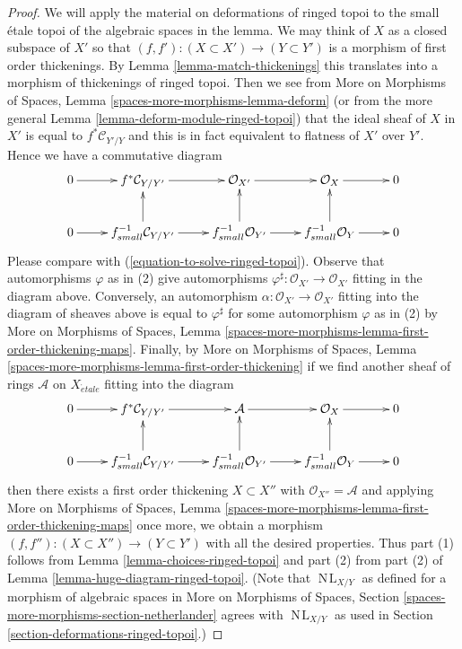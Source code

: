 \documentclass{stacks-project}
\theoremstyle{plain}
\theoremstyle{definition}
\theoremstyle{remark}
\numberwithin{equation}{subsection}
\def\NL{\mathop{N\!L}\nolimits}
\def\etale{{\acute{e}tale}}
\begin{document}
\begin{proof}
We will apply the material on deformations of ringed topoi
to the small \'etale topoi of the algebraic spaces in the lemma.
We may think of $X$ as a closed subspace of $X'$
so that $(f, f') : (X \subset X') \to (Y \subset Y')$
is a morphism of first order thickenings.
By Lemma \ref{lemma-match-thickenings}
this translates into a morphism of thickenings of ringed topoi.
Then we see from More on Morphisms of Spaces, Lemma
\ref{spaces-more-morphisms-lemma-deform}
(or from the more general Lemma \ref{lemma-deform-module-ringed-topoi})
that the ideal sheaf of $X$ in $X'$ is equal to $f^*\mathcal{C}_{Y'/Y}$
and this is in fact equivalent to flatness of $X'$ over $Y'$.
Hence we have a commutative diagram
$$
\xymatrix{
0 \ar[r] & f^*\mathcal{C}_{Y/Y'} \ar[r] &
\mathcal{O}_{X'} \ar[r] &
\mathcal{O}_X \ar[r] & 0 \\
0 \ar[r] &
f_{small}^{-1}\mathcal{C}_{Y/Y'} \ar[u] \ar[r] &
f_{small}^{-1}\mathcal{O}_{Y'} \ar[u] \ar[r] &
f_{small}^{-1}\mathcal{O}_Y \ar[u] \ar[r] & 0
}
$$
Please compare with (\ref{equation-to-solve-ringed-topoi}).
Observe that automorphisms $\varphi$ as in (2)
give automorphisms $\varphi^\sharp : \mathcal{O}_{X'} \to \mathcal{O}_{X'}$
fitting in the diagram above. Conversely, an automorphism
$\alpha : \mathcal{O}_{X'} \to \mathcal{O}_{X'}$
fitting into the diagram of sheaves above is equal to $\varphi^\sharp$
for some automorphism $\varphi$ as in (2)
by More on Morphisms of Spaces, Lemma
\ref{spaces-more-morphisms-lemma-first-order-thickening-maps}.
Finally, by More on Morphisms of Spaces, Lemma
\ref{spaces-more-morphisms-lemma-first-order-thickening}
if we find another sheaf of rings $\mathcal{A}$ on $X_\etale$
fitting into the diagram
$$
\xymatrix{
0 \ar[r] & f^*\mathcal{C}_{Y/Y'} \ar[r] &
\mathcal{A} \ar[r] &
\mathcal{O}_X \ar[r] & 0 \\
0 \ar[r] &
f_{small}^{-1}\mathcal{C}_{Y/Y'} \ar[u] \ar[r] &
f_{small}^{-1}\mathcal{O}_{Y'} \ar[u] \ar[r] &
f_{small}^{-1}\mathcal{O}_Y \ar[u] \ar[r] & 0
}
$$
then there exists a first order thickening $X \subset X''$
with $\mathcal{O}_{X''} = \mathcal{A}$ and applying 
More on Morphisms of Spaces, Lemma
\ref{spaces-more-morphisms-lemma-first-order-thickening-maps}
once more, we obtain a morphism
$(f, f'') : (X \subset X'') \to (Y \subset Y')$ with all the
desired properties.
Thus part (1) follows from
Lemma \ref{lemma-choices-ringed-topoi}
and part (2) from part (2) of
Lemma \ref{lemma-huge-diagram-ringed-topoi}.
(Note that $\NL_{X/Y}$ as defined for a morphism of algebraic spaces in
More on Morphisms of Spaces, Section
\ref{spaces-more-morphisms-section-netherlander}
agrees with $\NL_{X/Y}$ as used in
Section \ref{section-deformations-ringed-topoi}.)
\end{proof}
\end{document}
